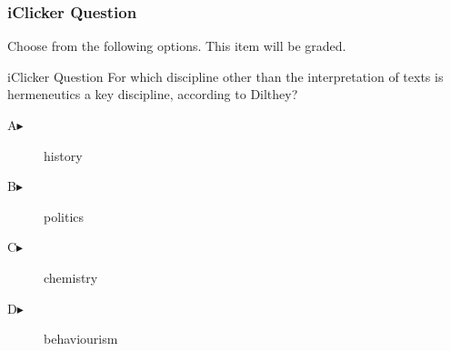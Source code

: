\begin{frame}
  \frametitle{iClicker Question}
Choose from the following options. This item will be graded.
\begin{block}{iClicker Question}
For which discipline other than the interpretation of texts is
hermeneutics a key discipline, according to Dilthey?
\end{block}
\begin{description}
\item[A\hspace{.2in}$\blacktriangleright$] history
\item[B\hspace{.2in}$\blacktriangleright$] politics
\item[C\hspace{.2in}$\blacktriangleright$] chemistry
\item[D\hspace{.2in}$\blacktriangleright$] behaviourism
\end{description}
\end{frame}
